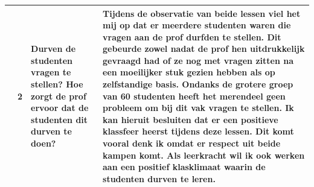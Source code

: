 \documentclass[a4paper,12pt,twoside]{article}%
\begin{document}
\begin{landscape}
\begin{tabularx}{1.56\textwidth}{|Q{0.25\textwidth}|Q{0.1\textwidth}|Q{0.25\textwidth}|Q{0.85\textwidth}|}
		\end{tabularx}
		
		\begin{tabularx}{1.56\textwidth}{|Q{0.25\textwidth}|Q{0.1\textwidth}|Q{0.25\textwidth}|Q{0.85\textwidth}|}	& 2 & Durven de studenten vragen te stellen? Hoe zorgt de prof ervoor dat de studenten dit durven te doen? & Tijdens de observatie van beide lessen viel het mij op dat er meerdere studenten waren die vragen aan de prof durfden te stellen. Dit gebeurde zowel nadat de prof hen uitdrukkelijk gevraagd had of ze nog met vragen zitten na een moeilijker stuk gezien hebben als op zelfstandige basis. Ondanks de grotere groep van 60 studenten heeft het merendeel geen probleem om bij dit vak vragen te stellen. Ik kan hieruit besluiten dat er een positieve klassfeer heerst tijdens deze lessen. Dit komt vooral denk ik omdat er respect uit beide kampen komt. Als leerkracht wil ik ook werken aan een positief klasklimaat waarin de studenten durven te leren. \\\hline	
		\end{tabularx}
	\end{landscape}




\end{document}

